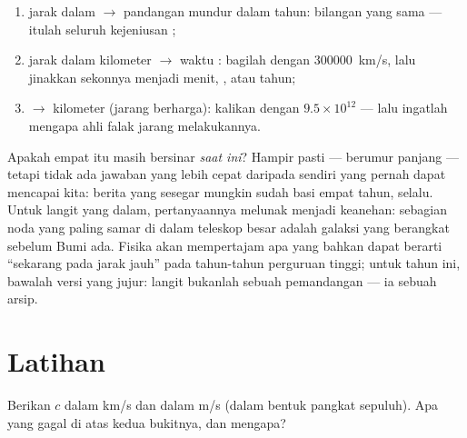 \begin{method}\label{met:g8:speed-of-light:convert}
\begin{enumerate}
  \item jarak dalam  $\to$ pandangan mundur dalam tahun:
        bilangan yang sama --- itulah seluruh kejeniusan ;
  \item jarak dalam kilometer $\to$ waktu : bagilah dengan
        \qty{300000}{km/s}, lalu jinakkan sekonnya menjadi menit,
        , atau tahun;
  \item {} $\to$ kilometer (jarang berharga):
        kalikan dengan $9.5 \times 10^{12}$ --- lalu ingatlah
        mengapa ahli falak jarang melakukannya.
\end{enumerate}
\end{method}

\begin{remark}\label{rem:g8:speed-of-light:now}
Apakah  empat  itu masih bersinar \emph{saat ini}?
Hampir pasti ---  berumur panjang --- tetapi tidak ada jawaban
yang lebih cepat daripada  sendiri yang pernah dapat mencapai
kita: berita yang sesegar mungkin sudah basi empat tahun, selalu.
Untuk langit yang dalam, pertanyaannya melunak menjadi keanehan:
sebagian noda yang paling samar di dalam teleskop besar adalah galaksi
yang  berangkat sebelum Bumi ada. Fisika akan mempertajam apa
yang bahkan dapat berarti ``sekarang pada jarak jauh'' pada
tahun-tahun perguruan tinggi; untuk tahun ini, bawalah versi yang
jujur: langit bukanlah sebuah pemandangan --- ia sebuah arsip.
\end{remark}

\section{Latihan}

\begin{exercise}[$\star$]\label{exo:g8:speed-of-light:1}
Berikan $c$ dalam \unit{km/s} dan dalam \unit{m/s} (dalam bentuk
pangkat sepuluh). Apa yang gagal di atas kedua bukitnya, dan mengapa?
\end{exercise}

